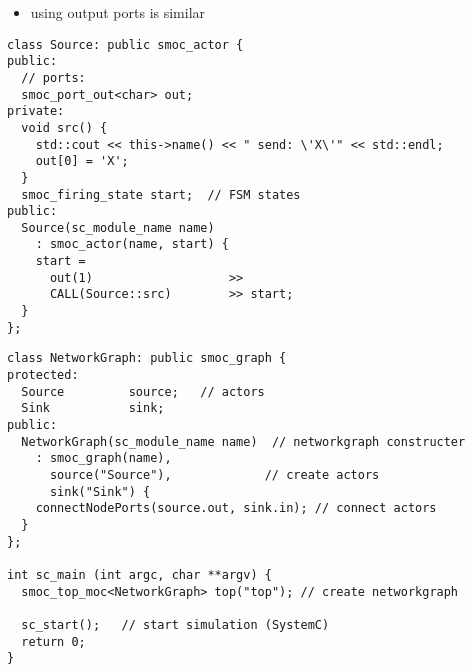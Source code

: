 \begin{frame}[fragile=singleslide]
\begin{itemize}
\item using output ports is similar
\end{itemize}
\begin{lstlisting}
class Source: public smoc_actor {
public:
  // ports:
  smoc_port_out<char> out;
private:
  void src() {
    std::cout << this->name() << " send: \'X\'" << std::endl;
    out[0] = 'X';
  }
  smoc_firing_state start;  // FSM states
public:
  Source(sc_module_name name)
    : smoc_actor(name, start) {
    start = 
      out(1)                   >>
      CALL(Source::src)        >> start;
  }
};
\end{lstlisting}
\end{frame}




\begin{frame}[fragile=singleslide]
\begin{lstlisting}
class NetworkGraph: public smoc_graph {
protected:
  Source         source;   // actors
  Sink           sink;
public:
  NetworkGraph(sc_module_name name)  // networkgraph constructer
    : smoc_graph(name),
      source("Source"),             // create actors
      sink("Sink") {
    connectNodePorts(source.out, sink.in); // connect actors
  }
};

int sc_main (int argc, char **argv) {
  smoc_top_moc<NetworkGraph> top("top"); // create networkgraph

  sc_start();   // start simulation (SystemC)
  return 0;
}
\end{lstlisting}
\end{frame}




